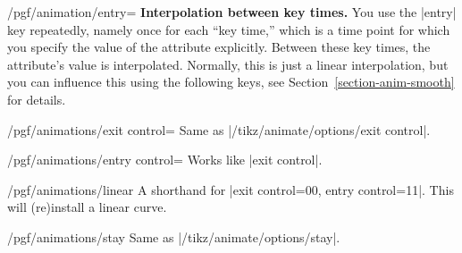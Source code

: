 \begin{key}{/pgf/animation/entry=}
  \medskip
  \textbf{Interpolation between key times.}
  You use the |entry| key repeatedly, namely once for each ``key
  time,'' which is a time point for which you specify the value of the
  attribute explicitly. Between these key times, the attribute's value
  is interpolated. Normally, this is just a linear interpolation, but
  you can influence this using the following keys, see
  Section~\ref{section-anim-smooth} for details.
  
  \begin{key}{/pgf/animations/exit control=}
    Same as |/tikz/animate/options/exit control|.

\begin{codeexample}[animation list={0.333/\frac{1}{3},0.666/\frac{2}{3},1,1.333/1\frac{1}{3},1.666/1\frac{2}{3}}]
\end{codeexample}
  \end{key}

  \begin{key}{/pgf/animations/entry control=}
    Works like |exit control|.
  \end{key}

  \begin{key}{/pgf/animations/linear}
    A shorthand for |exit control={0}{0}, entry control={1}{1}|. This
    will (re)install a linear curve.
  \end{key}

  \begin{key}{/pgf/animations/stay}
    Same as |/tikz/animate/options/stay|.

\begin{codeexample}[animation list={0.5,1,1.5,2,2.5}]
\end{codeexample}
\end{key}
  

\end{key}
